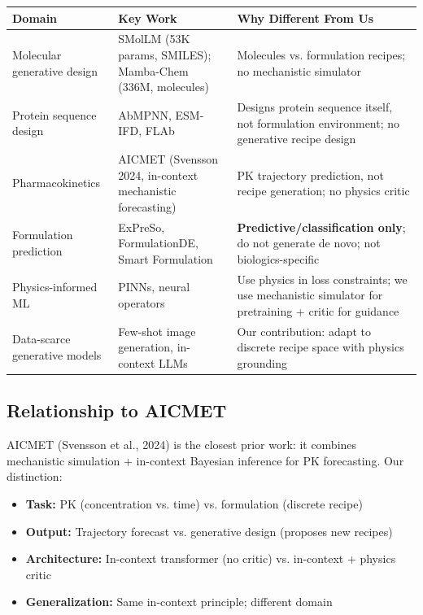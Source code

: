 \documentclass[11pt]{article}
\begin{document}
\begin{table}[h]
\centering
\begin{tabular}{p{3cm}p{4cm}p{5cm}}
\toprule
\textbf{Domain} & \textbf{Key Work} & \textbf{Why Different From Us} \\
\midrule
Molecular generative design & SMolLM (53K params, SMILES); Mamba-Chem (336M, molecules) & Molecules vs. formulation recipes; no mechanistic simulator \\
Protein sequence design & AbMPNN, ESM-IFD, FLAb & Designs protein sequence itself, not formulation environment; no generative recipe design \\
Pharmacokinetics & AICMET (Svensson 2024, in-context mechanistic forecasting) & PK trajectory prediction, not recipe generation; no physics critic \\
Formulation prediction & ExPreSo, FormulationDE, Smart Formulation & \textbf{Predictive/classification only}; do not generate de novo; not biologics-specific \\
Physics-informed ML & PINNs, neural operators & Use physics in loss constraints; we use mechanistic simulator for pretraining + critic for guidance \\
Data-scarce generative models & Few-shot image generation, in-context LLMs & Our contribution: adapt to discrete recipe space with physics grounding \\
\bottomrule
\end{tabular}
\end{table}

\subsection{Relationship to AICMET}

AICMET (Svensson et al., 2024) is the closest prior work: it combines mechanistic simulation + in-context Bayesian inference for PK forecasting. Our distinction:
\begin{itemize}
    \item \textbf{Task:} PK (concentration vs. time) vs. formulation (discrete recipe)
    \item \textbf{Output:} Trajectory forecast vs. generative design (proposes new recipes)
    \item \textbf{Architecture:} In-context transformer (no critic) vs. in-context + physics critic
    \item \textbf{Generalization:} Same in-context principle; different domain
\end{itemize}
\end{document}
